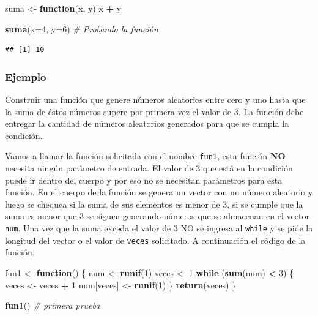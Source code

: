 \documentclass[10pt,]{krantz}
\makeatletter
\newenvironment{Shaded}{\begin{snugshade}}{\end{snugshade}}
\newcommand{\KeywordTok}[1]{\textcolor[rgb]{0.13,0.29,0.53}{\textbf{#1}}}
\newcommand{\DataTypeTok}[1]{\textcolor[rgb]{0.13,0.29,0.53}{#1}}
\newcommand{\DecValTok}[1]{\textcolor[rgb]{0.00,0.00,0.81}{#1}}
\newcommand{\StringTok}[1]{\textcolor[rgb]{0.31,0.60,0.02}{#1}}
\newcommand{\CommentTok}[1]{\textcolor[rgb]{0.56,0.35,0.01}{\textit{#1}}}
\newcommand{\ControlFlowTok}[1]{\textcolor[rgb]{0.13,0.29,0.53}{\textbf{#1}}}
\newcommand{\OperatorTok}[1]{\textcolor[rgb]{0.81,0.36,0.00}{\textbf{#1}}}
\newcommand{\NormalTok}[1]{#1}
\newenvironment{kframe}{%
\medskip{}
\setlength{\fboxsep}{.8em}
 \def\at@end@of@kframe{}%
 \ifinner\ifhmode%
  \def\at@end@of@kframe{\end{minipage}}%
  \begin{minipage}{\columnwidth}%
 \fi\fi%
 \def\FrameCommand##1{\hskip\@totalleftmargin \hskip-\fboxsep
 \colorbox{shadecolor}{##1}\hskip-\fboxsep
     \hskip-\linewidth \hskip-\@totalleftmargin \hskip\columnwidth}%
 \MakeFramed {\advance\hsize-\width
   \@totalleftmargin\z@ \linewidth\hsize
   \@setminipage}}%
 {\par\unskip\endMakeFramed%
 \at@end@of@kframe}
\renewenvironment{Shaded}{\begin{kframe}}{\end{kframe}}
\makeatother
\begin{document}
\begin{Shaded}
\begin{Highlighting}[]
\NormalTok{suma <-}\StringTok{ }\ControlFlowTok{function}\NormalTok{(x, y) x }\OperatorTok{+}\StringTok{ }\NormalTok{y}

\KeywordTok{suma}\NormalTok{(}\DataTypeTok{x=}\DecValTok{4}\NormalTok{, }\DataTypeTok{y=}\DecValTok{6}\NormalTok{)  }\CommentTok{# Probando la función}
\end{Highlighting}
\end{Shaded}

\begin{verbatim}
## [1] 10
\end{verbatim}

\subsubsection*{Ejemplo}\label{ejemplo-6}

Construir una función que genere números aleatorios entre cero y uno
hasta que la suma de éstos números supere por primera vez el valor de 3.
La función debe entregar la cantidad de números aleatorios generados
para que se cumpla la condición.

Vamos a llamar la función solicitada con el nombre \texttt{fun1}, esta
función \textbf{NO} necesita ningún parámetro de entrada. El valor de 3
que está en la condición puede ir dentro del cuerpo y por eso no se
necesitan parámetros para esta función. En el cuerpo de la función se
genera un vector con un número aleatorio y luego se chequea si la suma
de sus elementos es menor de 3, si se cumple que la suma es menor que 3
se siguen generando números que se almacenan en el vector \texttt{num}.
Una vez que la suma exceda el valor de 3 NO se ingresa al \texttt{while}
y se pide la longitud del vector o el valor de \texttt{veces}
solicitado. A continuación el código de la función.

\begin{Shaded}
\begin{Highlighting}[]
\NormalTok{fun1 <-}\StringTok{ }\ControlFlowTok{function}\NormalTok{() \{}
\NormalTok{  num <-}\StringTok{ }\KeywordTok{runif}\NormalTok{(}\DecValTok{1}\NormalTok{)}
\NormalTok{  veces <-}\StringTok{ }\DecValTok{1}
  \ControlFlowTok{while}\NormalTok{ (}\KeywordTok{sum}\NormalTok{(num) }\OperatorTok{<}\StringTok{ }\DecValTok{3}\NormalTok{) \{}
\NormalTok{    veces <-}\StringTok{ }\NormalTok{veces }\OperatorTok{+}\StringTok{ }\DecValTok{1}
\NormalTok{    num[veces] <-}\StringTok{ }\KeywordTok{runif}\NormalTok{(}\DecValTok{1}\NormalTok{)}
\NormalTok{  \}}
  \KeywordTok{return}\NormalTok{(veces)}
\NormalTok{\}}

\KeywordTok{fun1}\NormalTok{()  }\CommentTok{# primera prueba}
\end{Highlighting}
\end{Shaded}
\end{document}
